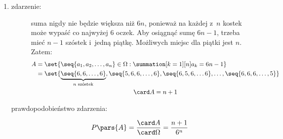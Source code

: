 \begin{enumerate}[label={\alph*)}]
    \item
        \begin{description}
            \item[zdarzenie:] suma nigdy nie będzie większa niż \(6n\), ponieważ na każdej z~\(n\) kostek może wypaść co najwyżej \(6\) oczek. Aby osiągnąć sumę \(6n - 1\), trzeba mieć \(n - 1\) szóstek i~jedną piątkę. Możliwych miejsc dla piątki jest \(n\). Zatem:
                \begin{gather*}
                    \begin{split}
                        A &= \set{\seq{a_1, a_2, \ldots, a_n} \in \Omega : \summation[k = 1][n]a_k = 6n - 1}\\
                            &= \set{\underbrace{\seq{6, 6, \ldots, 6}}_{n\text{ szóstek}}, \seq{5, 6, 6, \ldots, 6}, \seq{6, 5, 6, \ldots 6}, \ldots, \seq{6, 6, 6,\ldots, 5}}
                    \end{split}\\
                    \card A = n + 1
                \end{gather*}
            \item[prawdopodobieństwo zdarzenia:]
                \begin{equation*}
                    P\pars{A}
                        = \frac{\card A}{\card \Omega}
                        = \frac{n + 1}{6^n}
                \end{equation*}
        \end{description}
\end{enumerate}
